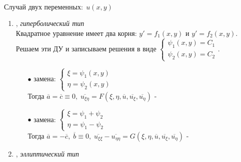 \vspace{0.5cm}
$\textbf{Случай двух переменных}: \; u(x,y)$

\begin{enumerate}
	\item {}, \textit{гиперболический тип}\\

	Квадратное уравнение имеет два корня: $y' = f_1 (x,y)$ и $y' = f_2 (x,y)$. \\
	Решаем эти ДУ и записываем решения в виде $\begin{cases}
		\psi_1 (x,y) = C_1 \\ \psi_2 (x,y) = C_2
	\end{cases}.$\\
	\begin{itemize}
		\item[$\bullet$] замена: $\begin{cases}
			\xi = \psi_1 (x,y) \\ \eta = \psi_2 (x,y)
		\end{cases}$\\
		Тогда $\overline{a} = \overline{c} \equiv 0, \; \overline{u_{\xi \eta}} = F(\xi, \eta, \overline{u}, \overline{u_{\xi}}, \overline{u_{\eta}})$ - 
		\item[$\bullet$] замена: $\begin{cases}
			\xi = \psi_1 + \psi_2 \\ \eta = \psi_1 - \psi_2
		\end{cases}$\\
		Тогда $\overline{a} = -\overline{c}, \; \overline{b} \equiv 0, \; \overline{u_{\xi \xi}} - \overline{u_{\eta \eta}} = G(\xi, \eta, \overline{u}, \overline{u_{\xi}}, \overline{u_{\eta}})$ - 
	\end{itemize}
	\item {}, \textit{эллиптический тип}\\


\end{enumerate}
